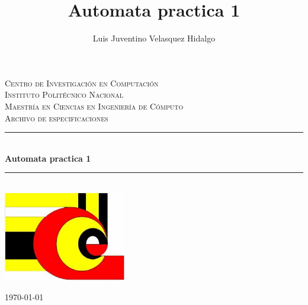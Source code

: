 \documentclass[
	12pt,
	spanish,
]{./recursos/fphw}
\begin{document}
\title{Automata practica 1}
\author{Luis Juventino Velasquez Hidalgo} 
\begin{titlepage} 
    \center 
    \newcommand{\HRule}{\rule{\linewidth}{0.5mm}} 

    \textsc{\LARGE Centro de Investigación en Computación \\ Instituto Politécnico Nacional }\\[1.5cm]
    \textsc{\Large Maestría en Ciencias en Ingeniería de Cómputo}\\[0.5cm]
    \textsc{\large Archivo de especificaciones}\\[0.5cm]

    \HRule\\[0.4cm]
    \huge\bfseries Automata practica 1\\[0.4cm]
    \HRule\\[1.5cm]


    \vfill\vfill
    \includegraphics[width=0.4\textwidth]{CIC.jpg}
     
    \vfill\vfill\vfill 
    \large\today 
    \vfill 
\end{titlepage}
\end{document}
